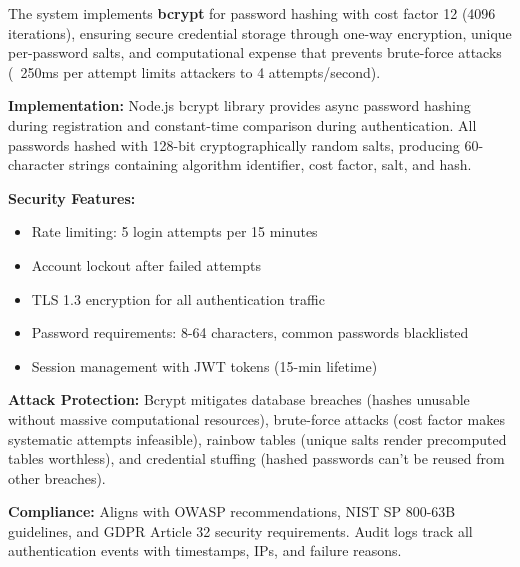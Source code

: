 \documentclass[12pt,a4paper]{article}
\begin{document}
\begin{tcolorbox}[colback=primaryblue!5, colframe=primaryblue, boxrule=1pt, arc=3pt, left=10pt, right=10pt, top=8pt, bottom=8pt]

The system implements \textbf{bcrypt} for password hashing with cost factor 12 (4096 iterations), ensuring secure credential storage through one-way encryption, unique per-password salts, and computational expense that prevents brute-force attacks (~250ms per attempt limits attackers to 4 attempts/second).

\vspace{0.5em}

\textbf{Implementation:} Node.js bcrypt library provides async password hashing during registration and constant-time comparison during authentication. All passwords hashed with 128-bit cryptographically random salts, producing 60-character strings containing algorithm identifier, cost factor, salt, and hash.

\vspace{0.5em}

\textbf{Security Features:}
\begin{itemize}[leftmargin=1.5em, itemsep=4pt]
    \item Rate limiting: 5 login attempts per 15 minutes
    \item Account lockout after failed attempts
    \item TLS 1.3 encryption for all authentication traffic
    \item Password requirements: 8-64 characters, common passwords blacklisted
    \item Session management with JWT tokens (15-min lifetime)
\end{itemize}

\vspace{0.5em}

\textbf{Attack Protection:} Bcrypt mitigates database breaches (hashes unusable without massive computational resources), brute-force attacks (cost factor makes systematic attempts infeasible), rainbow tables (unique salts render precomputed tables worthless), and credential stuffing (hashed passwords can't be reused from other breaches).

\vspace{0.5em}

\textbf{Compliance:} Aligns with OWASP recommendations, NIST SP 800-63B guidelines, and GDPR Article 32 security requirements. Audit logs track all authentication events with timestamps, IPs, and failure reasons.

\end{tcolorbox}
\end{document}
